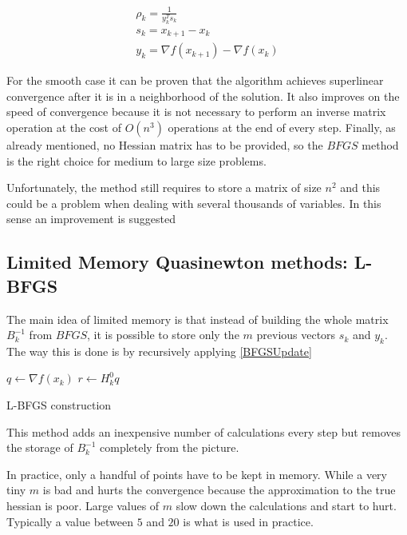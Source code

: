 \begin{equation*}
  \begin{aligned}
   \rho_k = \frac{1}{y_k^T s_k} \\
    s_k = x_{k+1} - x_k \\
    y_k = \nabla f(x_{k+1}) - \nabla f(x_k)
  \end{aligned}
\end{equation*} 

For the smooth case it can be proven that the algorithm achieves superlinear convergence after it is in a neighborhood of the solution.  It also improves on the speed of convergence because it is not necessary to perform an inverse matrix operation at the cost of $O(n^3)$ operations at the end of every step.  Finally, as already mentioned, no Hessian matrix has to be provided, so the $BFGS$ method is the right choice for medium to large size problems.

Unfortunately, the method still requires to store a matrix of size $n^2$ and this could be a problem when dealing with several thousands of variables.  In this sense an improvement is suggested

\subsection{Limited Memory Quasinewton methods: L-BFGS }

The main idea of limited memory is that instead of building the whole matrix $B_k^{-1}$ from $BFGS$, it is possible to store only the $m$ previous vectors $s_k$ and $y_k$.  The way this is done is by recursively applying \ref{BFGSUpdate} \citep{nocedal}


\linesnumbered
\begin{algorithm}[H]
 \SetAlgoLined 
 
 $q \leftarrow \nabla f(x_k)$\;
 $r \leftarrow H_k^0q$\;
 \caption{L-BFGS construction\label{LBFGSalgo}}
\end{algorithm}

This method adds an inexpensive number of calculations every step but removes the storage of $B_k^{-1}$ completely from the picture.

In practice, only a handful of points have to be kept in memory.  While a very tiny $m$ is bad and hurts the convergence because the approximation to the true hessian is poor.  Large values of $m$ slow down the calculations and start to hurt.  Typically a value between $5$ and $20$ is what is used in practice.

